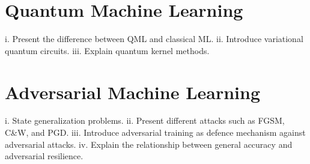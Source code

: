 
\section{Quantum Machine Learning}
i.	Present the difference between QML and classical ML\@.
ii.	Introduce variational quantum circuits.
iii.	Explain quantum kernel methods.

\section{Adversarial Machine Learning}
i.	State generalization problems.
ii.	Present different attacks such as FGSM, C\&W, and PGD\@.
iii.	Introduce adversarial training as defence mechanism against adversarial attacks.
iv.	Explain the relationship between general accuracy and adversarial resilience.